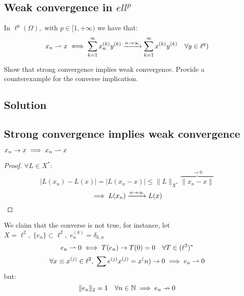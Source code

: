 \subsection{Weak convergence in \texorpdfstring{$ell^p$}{lp}}
In $\ell^p(\Omega),\text{ with }p\in[1,+\infty) $ we have that:
\[x_n \rightharpoonup x \iff \sum_{k=1}^\infty x_n^{(k)} y^{(k)} \xrightarrow{n\to\infty} \sum_{k=1}^\infty x^{(k)} y^{(k)}  \quad\forall y \in \ell^q ) \]


\question
Show that strong convergence implies weak convergence. Provide a counterexample for the
converse implication.

\subsection*{Solution}

\subsection{Strong convergence implies weak convergence}
$x_n \to x \implies x_n \rightharpoonup x$
\begin{proof}
   $\forall L \in X^*:$
    \[
    |L(x_n)-L(x)| = |L(x_n-x)| \le \|L\|_{X^*}\overbrace{\|x_n-x\|}^{\to 0}
    \]
    \[
    \implies L(x_n) \xrightarrow{n\to\infty} L(x)
    \]
\end{proof}\noindent
We claim that the converse is not true, for instance, let $X=\ell^2,\; \{e_n\}\subset\ell^2,\;e_n^{(k)}=\delta_{k,n}$
\[
e_n \rightharpoonup 0 \iff T(e_n) \to T(0) = 0\quad \forall T \in (\ell^2)^*
\]
\[
\forall x \equiv x^{(j)} \in \ell^2,\; \sum e^{(j)} x^{(j) }= x^(n) \to 0 \implies e_n \rightharpoonup 0
\]
but:
\[
\|e_n\|_2 = 1 \quad \forall n \in \mathbb{N} \implies e_n \nrightarrow 0
\]
